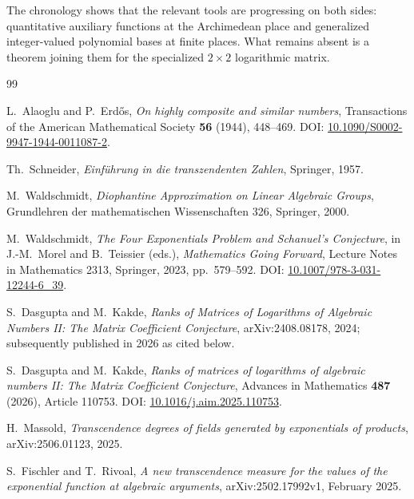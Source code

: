 \documentclass[11pt,oneside]{article}
\theoremstyle{definition}
\theoremstyle{remark}
\begin{document}
The chronology shows that the relevant tools are progressing on both sides: quantitative
auxiliary functions at the Archimedean place and generalized integer-valued polynomial bases
at finite places.  What remains absent is a theorem joining them for the specialized
$2\times2$ logarithmic matrix.


\begin{thebibliography}{99}

L.~Alaoglu and P.~Erd\H{o}s,
\newblock \emph{On highly composite and similar numbers},
\newblock Transactions of the American Mathematical Society \textbf{56} (1944), 448--469.
\newblock DOI: \href{https://doi.org/10.1090/S0002-9947-1944-0011087-2}{10.1090/S0002-9947-1944-0011087-2}.

Th.~Schneider,
\newblock \emph{Einf\"uhrung in die transzendenten Zahlen},
\newblock Springer, 1957.

M.~Waldschmidt,
\newblock \emph{Diophantine Approximation on Linear Algebraic Groups},
\newblock Grundlehren der mathematischen Wissenschaften 326, Springer, 2000.

M.~Waldschmidt,
\newblock \emph{The Four Exponentials Problem and Schanuel's Conjecture},
\newblock in J.-M.~Morel and B.~Teissier (eds.), \emph{Mathematics Going Forward},
Lecture Notes in Mathematics 2313, Springer, 2023, pp.~579--592.
\newblock DOI: \href{https://doi.org/10.1007/978-3-031-12244-6_39}{10.1007/978-3-031-12244-6\_39}.

S.~Dasgupta and M.~Kakde,
\newblock \emph{Ranks of Matrices of Logarithms of Algebraic Numbers II: The Matrix
Coefficient Conjecture},
\newblock arXiv:2408.08178, 2024; subsequently published in 2026 as cited below.

S.~Dasgupta and M.~Kakde,
\newblock \emph{Ranks of matrices of logarithms of algebraic numbers II: The Matrix
Coefficient Conjecture},
\newblock Advances in Mathematics \textbf{487} (2026), Article 110753.
\newblock DOI: \href{https://doi.org/10.1016/j.aim.2025.110753}{10.1016/j.aim.2025.110753}.

H.~Massold,
\newblock \emph{Transcendence degrees of fields generated by exponentials of products},
\newblock arXiv:2506.01123, 2025.

S.~Fischler and T.~Rivoal,
\newblock \emph{A new transcendence measure for the values of the exponential function at algebraic arguments},
\newblock arXiv:2502.17992v1, February 2025.


\end{thebibliography}
\end{document}
